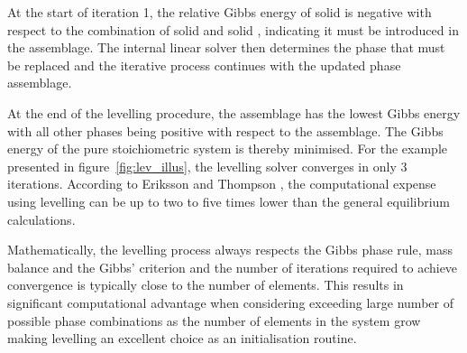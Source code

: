 	At the start of iteration 1, the relative Gibbs energy of solid  is negative with respect to the combination of solid  and solid , indicating it must be introduced in the assemblage. The internal linear solver then determines the phase that must be replaced and the iterative process continues with the updated phase assemblage.

	At the end of the levelling procedure, the assemblage has the lowest Gibbs energy with all other phases being positive with respect to the assemblage. The Gibbs energy of the pure stoichiometric system is thereby minimised. For the example presented in figure~\ref{fig:lev_illus}, the levelling solver converges in only 3 iterations. According to Eriksson and Thompson \cite{Eriksson89}, the computational expense using levelling can be up to two to five times lower than the general equilibrium calculations.

	Mathematically, the levelling  process always respects the Gibbs phase rule, mass balance and the Gibbs' criterion and the number of iterations required to achieve convergence is typically close to the number of elements. This results in significant computational advantage when considering exceeding large number of possible phase combinations as the number of elements in the system grow making levelling an excellent choice as an initialisation routine.

